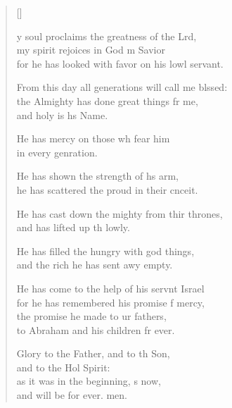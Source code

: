 \settowidth{\versewidth}{From this day all generations will call me blessed: +}
\begin{verse}[\versewidth]
  \begin{patverse}
y soul proclaims the greatness of the Lrd,\Flex\\
my spirit rejoices in God m Savior\Med\\
for he has looked with favor on his lowl servant.

From this day all generations will call me blssed:\Flex\\
the Almighty has done great things fr me,\Med\\
and holy is h\pointup{\i}s Name.

He has mercy on those wh fear him\Med\\
in every genration.

He has shown the strength of h\pointup{\i}s arm,\Med\\
he has scattered the proud in their cnceit.

He has cast down the mighty from thir thrones,\Med\\
and has lifted up th lowly.

He has filled the hungry with god things,\Med\\
and the rich he has sent awy empty.

He has come to the help of his servnt Israel\Med\\
for he has remembered his promise f mercy,\\
the promise he made to ur fathers,\Med\\
to Abraham and his children fr ever.

Glory to the Father, and to th Son,\Med\\
and to the Hol Spirit:\\
as it was in the beginning, \pointup{\i}s now,\Med\\
and will be for ever. men.
  \end{patverse}
\end{verse}

